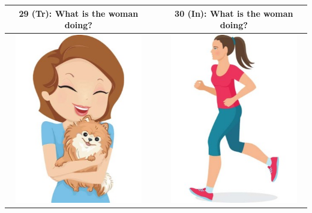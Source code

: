 \begin{tabular}{|c|c|c|}
\hline
29 (Tr): What is the woman doing? && 30 (In): What is the woman doing? \\
\hline
\includegraphics[width=15em,trim=0 0 0 -3]{figures/I29.jpg} & & \includegraphics[width=15em,trim=0 0 0 -3]{figures/I30.jpg} \\
\hline
\end{tabular}

%